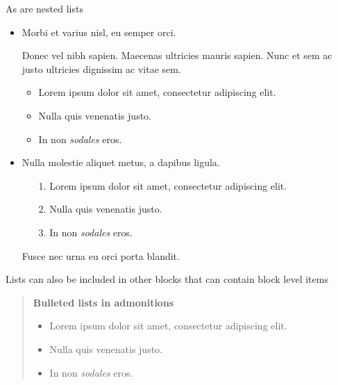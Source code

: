 As are nested lists



\begin{itemize}
\item Morbi et varius nisl, eu semper orci.

Donec vel nibh sapien. Maecenas ultricies mauris sapien. Nunc et sem ac justo ultricies dignissim ac vitae sem.

\begin{itemize}
\item Lorem ipsum dolor sit amet, consectetur adipiscing elit.


\item Nulla quis venenatis justo.


\item In non \emph{sodales} eros.

\end{itemize}

\item Nulla molestie aliquet metus, a dapibus ligula.

\begin{itemize}
\item[1. ] Lorem ipsum dolor sit amet, consectetur adipiscing elit.


\item[2. ] Nulla quis venenatis justo.


\item[3. ] In non \emph{sodales} eros.

\end{itemize}
Fusce nec urna eu orci porta blandit.

\end{itemize}


Lists can also be included in other blocks that can contain block level items



\begin{quote}
\textbf{Bulleted lists in admonitions}

\begin{itemize}
\item Lorem ipsum dolor sit amet, consectetur adipiscing elit.


\item Nulla quis venenatis justo.


\item In non \emph{sodales} eros.

\end{itemize}
\end{quote}


